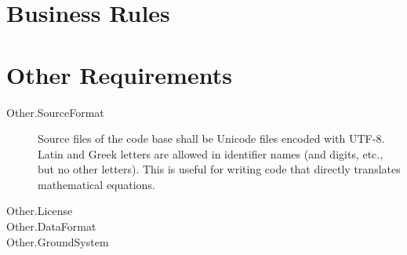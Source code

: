 \section{Business Rules}


\section{Other Requirements}


\begin{description}
\item[Other.SourceFormat] Source files of the code base shall be Unicode files encoded with UTF-8. Latin and Greek letters are allowed in identifier names (and digits, etc., but no other letters). This is useful for writing code that directly translates mathematical equations.

\item[Other.License] 

\item[Other.DataFormat] 

\item[Other.GroundSystem] 
\end{description}
